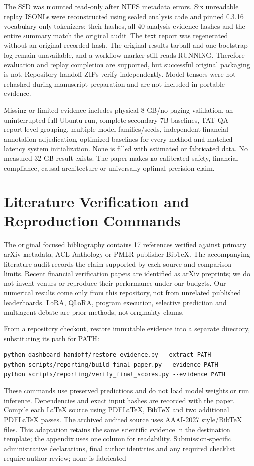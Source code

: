 \documentclass{article}
\begin{document}
The SSD was mounted read-only after NTFS metadata errors. Six unreadable replay JSONLs were reconstructed using sealed analysis code and pinned 0.3.16 vocabulary-only tokenizers; their hashes, all 40 analysis-evidence hashes and the entire summary match the original audit. The text report was regenerated without an original recorded hash. The original results tarball and one bootstrap log remain unavailable, and a workflow marker still reads RUNNING. Therefore evaluation and replay completion are supported, but successful original packaging is not. Repository handoff ZIPs verify independently. Model tensors were not rehashed during manuscript preparation and are not included in portable evidence.

Missing or limited evidence includes physical 8 GB/no-paging validation, an uninterrupted full Ubuntu run, complete secondary 7B baselines, TAT-QA report-level grouping, multiple model families/seeds, independent financial annotation adjudication, optimized baselines for every method and matched-latency system initialization. None is filled with estimated or fabricated data. No measured 32 GB result exists. The paper makes no calibrated safety, financial compliance, causal architecture or universally optimal precision claim.

\section{Literature Verification and Reproduction Commands}
The original focused bibliography contains 17 references verified against primary arXiv metadata, ACL Anthology or PMLR publisher BibTeX. The accompanying literature audit records the claim supported by each source and comparison limits. Recent financial verification papers are identified as arXiv preprints; we do not invent venues or reproduce their performance under our budgets. Our numerical results come only from this repository, not from unrelated published leaderboards. LoRA, QLoRA, program execution, selective prediction and multiagent debate are prior methods, not originality claims.

From a repository checkout, restore immutable evidence into a separate directory, substituting its path for PATH:

\noindent\begin{minipage}{\textwidth}
\begin{verbatim}
python dashboard_handoff/restore_evidence.py --extract PATH
python scripts/reporting/build_final_paper.py --evidence PATH
python scripts/reporting/verify_final_scores.py --evidence PATH
\end{verbatim}
\end{minipage}
These commands use preserved predictions and do not load model weights or run inference. Dependencies and exact input hashes are recorded with the paper. Compile each LaTeX source using PDFLaTeX, BibTeX and two additional PDFLaTeX passes. The archived audited source uses AAAI-2027 style/BibTeX files. This adaptation retains the same scientific evidence in the destination template; the appendix uses one column for readability. Submission-specific administrative declarations, final author identities and any required checklist require author review; none is fabricated.
\end{document}
